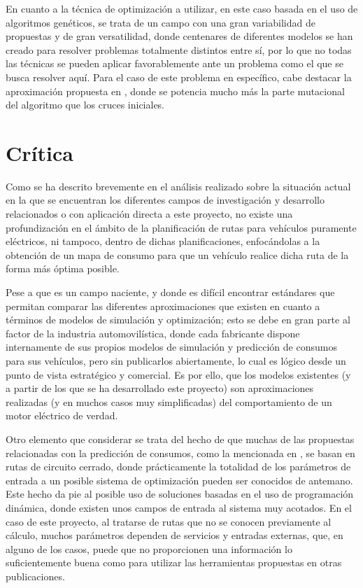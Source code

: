 \documentclass[11pt,spanish,listoffigures,listoftables]{tfgetsinf}
\begin{document}
En cuanto a la técnica de optimización a utilizar, en este caso basada en el uso de algoritmos genéticos, se trata de un campo con una gran variabilidad de propuestas y de gran versatilidad, donde centenares de diferentes modelos se han creado para resolver problemas totalmente distintos entre sí, por lo que no todas las técnicas se pueden aplicar favorablemente ante un problema como el que se busca resolver aquí. Para el caso de este problema en específico, cabe destacar la aproximación propuesta en \cite{DEFALCO2002285}, donde se potencia mucho más la parte mutacional del algoritmo que los cruces iniciales.

\section{Crítica}
Como se ha descrito brevemente en el análisis realizado sobre la situación actual en la que se encuentran los diferentes campos de investigación y desarrollo relacionados o con aplicación directa a este proyecto, no existe una profundización en el ámbito de la planificación de rutas para vehículos puramente eléctricos, ni tampoco, dentro de dichas planificaciones, enfocándolas a la obtención de un mapa de consumo para que un vehículo realice dicha ruta de la forma más óptima posible.

Pese a que es un campo naciente, y donde es difícil encontrar estándares que permitan comparar las diferentes aproximaciones que existen en cuanto a términos de modelos de simulación y optimización; esto se debe en gran parte al factor de la industria automovilística, donde cada fabricante dispone internamente de sus propios modelos de simulación y predicción de consumos para sus vehículos, pero sin publicarlos abiertamente, lo cual es lógico desde un punto de vista estratégico y comercial. Es por ello, que los modelos existentes (y a partir de los que se ha desarrollado este proyecto) son aproximaciones realizadas (y en muchos casos muy simplificadas) del comportamiento de un motor eléctrico de verdad.

Otro elemento que considerar se trata del hecho de que muchas de las propuestas relacionadas con la predicción de consumos, como la mencionada en \cite{Bader13}, se basan en rutas de circuito cerrado, donde prácticamente la totalidad de los parámetros de entrada a un posible sistema de optimización pueden ser conocidos de antemano. Este hecho da pie al posible uso de soluciones basadas en el uso de programación dinámica, donde existen unos campos de entrada al sistema muy acotados. En el caso de este proyecto, al tratarse de rutas que no se conocen previamente al cálculo, muchos parámetros dependen de servicios y entradas externas, que, en alguno de los casos, puede que no proporcionen una información lo suficientemente buena como para utilizar las herramientas propuestas en otras publicaciones.
\end{document}
